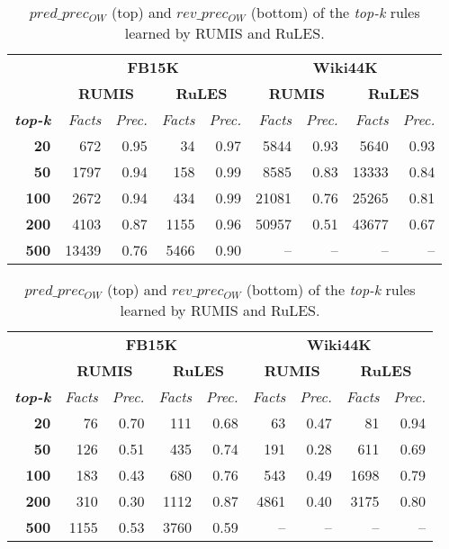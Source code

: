 \begin{table}[t]
\scriptsize
\centering
\begin{tabular}{r|r r|r r|r r|r r}
 & \multicolumn{4}{c}{\textbf{FB15K}} & \multicolumn{4}{|c}{\textbf{Wiki44K}} \\
 \cmidrule{2-9}&\multicolumn{2}{c}{\textbf{RUMIS}}&\multicolumn{2}{|c}{\textbf{RuLES}}&\multicolumn{2}{c}{\textbf{RUMIS}}&\multicolumn{2}{|c}{\textbf{RuLES}} \\
\textbf{\textit{top-k}} & \emph{Facts} & \emph{Prec.} & \emph{Facts} & \emph{Prec.} & \emph{Facts} & \emph{Prec.}& \emph{Facts} & \emph{Prec.} \\
 \midrule
\textbf{20} & 672 & 0.95 & 34 & 0.97 & 5844 & 0.93 & 5640 & 0.93 \\
\textbf{50} & 1797 & 0.94 & 158 & 0.99 & 8585 & 0.83 & 13333 & 0.84 \\
\textbf{100} & 2672 & 0.94 & 434 & 0.99 & 21081 & 0.76 & 25265 & 0.81 \\
\textbf{200} & 4103 & 0.87 & 1155 & 0.96 & 50957 & 0.51 & 43677 & 0.67 \\
\textbf{500} & 13439 & 0.76 & 5466 & 0.90 & -- & -- & -- & -- \\
\bottomrule
\end{tabular}
\begin{tabular}{r | r r| r r | r r |r r}
 & \multicolumn{4}{c}{\textbf{FB15K}} & \multicolumn{4}{|c}{\textbf{Wiki44K}} \\
 \cmidrule{2-9}&\multicolumn{2}{c}{\textbf{RUMIS}}&\multicolumn{2}{|c}{\textbf{RuLES}}&\multicolumn{2}{|c}{\textbf{RUMIS}}&\multicolumn{2}{|c}{\textbf{RuLES}} \\
\textbf{\textit{top-k}} & \emph{Facts} & \emph{Prec.} & \emph{Facts} & \emph{Prec.} & \emph{Facts} & \emph{Prec.}& \emph{Facts} & \emph{Prec.} \\
 \midrule
\textbf{20} & 76 & 0.70 & 111 & 0.68 & 63 & 0.47 & 81 & 0.94 \\
\textbf{50} & 126 & 0.51 & 435 & 0.74 & 191 & 0.28 & 611 & 0.69 \\
\textbf{100} & 183 & 0.43 & 680 & 0.76 & 543 & 0.49 & 1698 & 0.79 \\
\textbf{200} & 310 & 0.30 & 1112 & 0.87 & 4861 & 0.40 & 3175 & 0.80 \\
\textbf{500} & 1155 & 0.53 & 3760 & 0.59 & -- & -- & -- & -- \\
\bottomrule
\end{tabular}

\caption{$pred\_prec_{OW}$ (top) and $rev\_prec_{OW}$ (bottom)
of the \textit{top-k} rules learned by RUMIS and RuLES.}
\label{table:exception_prediction_result}
\vspace*{-3mm}
\end{table}